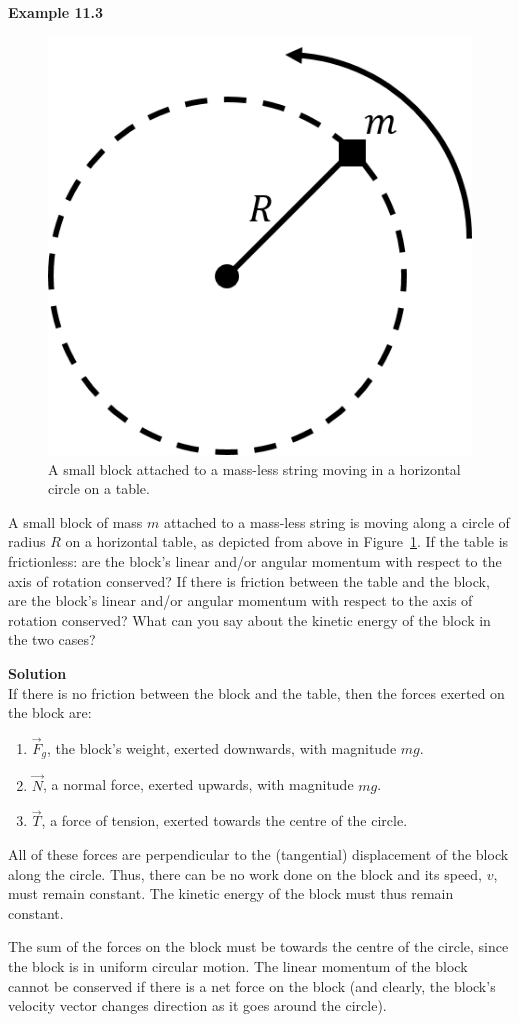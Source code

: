 \begin{framed}
\textbf{Example 11.3}\\
\begin{figure}[!htbp]
\centering
\includegraphics[width=0.25\linewidth]{files/circle-d31ab27f0e6119d03652d0284fcc0b14.png}
\caption[]{A small block attached to a mass-less string moving in a horizontal circle on a table.}
\label{fig:angularmomentumrolling:circle}
\end{figure}

A small block of mass $m$ attached to a mass-less string is moving along a circle of radius $R$ on a horizontal table, as depicted from above in Figure~\ref{fig:angularmomentumrolling:circle}. If the table is frictionless: are the block's linear and/or angular momentum with respect to the axis of rotation conserved? If there is friction between the table and the block, are the block's linear and/or angular momentum with respect to the axis of rotation conserved? What can you say about the kinetic energy of the block in the two cases?

\begin{framed}
\textbf{Solution}\\
If there is no friction between the block and the table, then the forces exerted on the block are:

\begin{enumerate}
\item $\vec F_g$, the block's weight, exerted downwards, with magnitude $mg$.
\item $\vec N$, a normal force, exerted upwards, with magnitude $mg$.
\item $\vec T$, a force of tension, exerted towards the centre of the circle.
\end{enumerate}

All of these forces are perpendicular to the (tangential) displacement of the block along the circle. Thus, there can be no work done on the block and its speed, $v$, must remain constant. The kinetic energy of the block must thus remain constant.

The sum of the forces on the block must be towards the centre of the circle, since the block is in uniform circular motion. The linear momentum of the block cannot be conserved if there is a net force on the block (and clearly, the block's velocity vector changes direction as it goes around the circle).


\end{framed}
\end{framed}
